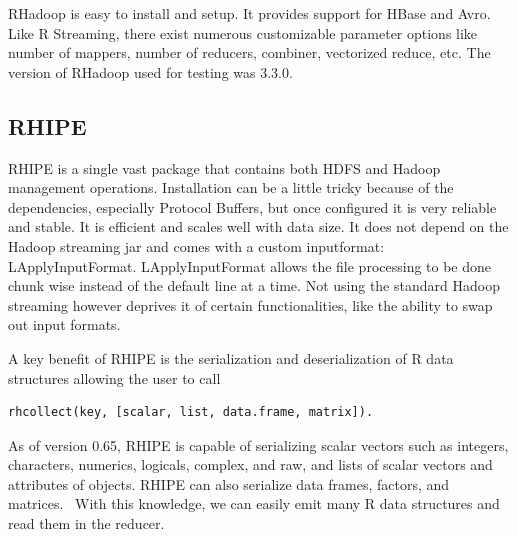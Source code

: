 \documentclass[
journal=jacsat, %
manuscript=article]{achemso}
\begin{document}
RHadoop is easy to install and setup. It provides support for HBase and Avro. Like R Streaming, there exist numerous customizable parameter options like number of mappers, number of reducers, combiner, vectorized reduce, etc. The version of RHadoop used for testing was 3.3.0.

\subsection{RHIPE}
RHIPE is a single vast package that contains both HDFS and Hadoop management operations. Installation can be a little tricky because of the dependencies, especially Protocol Buffers, but once configured it is very reliable and stable. It is efficient and scales well with data size. It does not depend on the Hadoop streaming jar and comes with a custom inputformat: LApplyInputFormat. LApplyInputFormat allows the file processing to be done chunk wise instead of the default line at a time.  Not using the standard Hadoop streaming however deprives it of certain functionalities, like the ability to swap out input formats. 

A key benefit of RHIPE is the serialization and deserialization of R data structures allowing the user to call 
\begin{lstlisting}
rhcollect(key, [scalar, list, data.frame, matrix]).
\end{lstlisting}
As of version 0.65, RHIPE is capable of serializing scalar vectors such as integers, characters, numerics, logicals, complex, and raw, and lists of scalar vectors and attributes of objects. RHIPE can also serialize data frames, factors, and matrices.~\cite{RHIPEDOCS} With this knowledge, we can easily emit many R data structures and read them in the reducer. 
\end{document}
